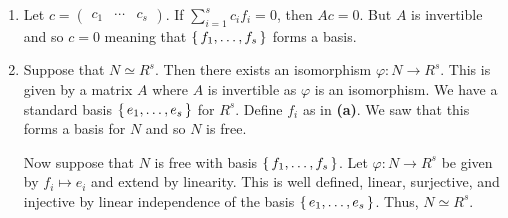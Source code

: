 \documentclass[letterpaper, 11pt, oneside]{book}
\begin{document}
\begin{sol}\label{ex:UAG_5.1.19}
  \begin{enumerate}
    \item Let $c = \begin{pmatrix} c_{1} & \cdots & c_{s} \end{pmatrix}$.
          If $\sum_{i = 1}^{s} c_{i}f_{i} = 0$, then $Ac = 0$.
          But $A$ is invertible and so $c = 0$ meaning that $\set{f_{1}, \ldots, f_{s}}$ forms a basis.
    \item Suppose that $N \simeq R^{s}$.
          Then there exists an isomorphism $\varphi\colon N \to R^{s}$.
          This is given by a matrix $A$ where $A$ is invertible as $\varphi$ is an isomorphism.
          We have a standard basis $\set{e_{1}, \ldots, e_{s}}$ for $R^{s}$.
          Define $f_{i}$ as in \textbf{(a)}.
          We saw that this forms a basis for $N$ and so $N$ is free.

          Now suppose that $N$ is free with basis $\set{f_{1}, \ldots, f_{s}}$.
          Let $\varphi\colon N \to R^{s}$ be given by $f_{i} \mapsto e_{i}$ and extend by linearity.
          This is well defined, linear, surjective, and injective by linear independence of the basis $\set{e_{1}, \ldots, e_{s}}$.
          Thus, $N \simeq R^{s}$.
  \end{enumerate}
\end{sol}

\printbibliography
\end{document}
